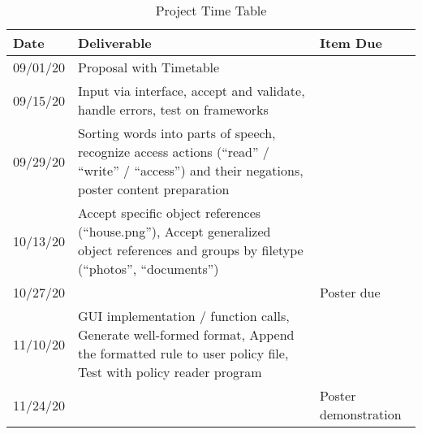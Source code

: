 \documentclass[12pt]{article}
\begin{document}

\begin{table}[p]
    \begin{center}
        \begin{tabular}{ | m{0.4in} | m{4in}| m{1.6in} | }
        \hline
        Date & Deliverable & Item Due \\ 
        \hline
        09/01/20 & Proposal with Timetable &   \\ 
        \hline
        09/15/20 & Input via interface, accept and validate, handle errors, test on frameworks &   \\ 
        \hline
        09/29/20 & Sorting words into parts of speech, recognize access actions (“read” / “write” / “access”) and their negations, poster content preparation &   \\ 
        \hline
        10/13/20 & Accept specific object references (“house.png”), Accept generalized object references and groups by filetype (“photos”, “documents”) &   \\ 
        \hline
        10/27/20 &   & Poster due \\ 
        \hline
        11/10/20 & GUI implementation / function calls, Generate well-formed format, Append the formatted rule to user policy file, Test with policy reader program &   \\
        \hline
        11/24/20 &   & Poster demonstration \\ 
        \hline
        \end{tabular}
        \caption{Project Time Table}
        \label{table:2}
    \end{center}
\end{table}



\end{document}
